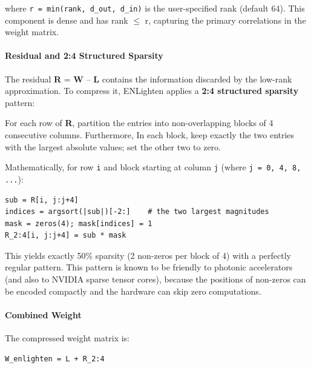 where \texttt{r = min(rank, d\_out, d\_in)} is the user-specified rank (default 64). This component is dense and has rank $\le$ r, capturing the primary correlations in the weight matrix.

\paragraph{Residual and 2:4 Structured Sparsity}

The residual \textbf{R} = \textbf{W} -- \textbf{L} contains the information discarded by the low-rank approximation. To compress it, ENLighten applies a \textbf{2:4 structured sparsity} pattern:

For each row of \textbf{R}, partition the entries into non-overlapping blocks of 4 consecutive columns. Furthermore, In each block, keep exactly the two entries with the largest absolute values; set the other two to zero.


Mathematically, for row \texttt{i} and block starting at column \texttt{j} (where \texttt{j = 0, 4, 8, ...}):

\vspace{0.5em}
\begin{mdframed}[backgroundcolor=codebg, linecolor=codeframe, linewidth=1pt, roundcorner=4pt, innerleftmargin=2pt, innerrightmargin=5pt, innertopmargin=5pt, innerbottommargin=5pt]
\begin{lstlisting}
sub = R[i, j:j+4]
indices = argsort(|sub|)[-2:]    # the two largest magnitudes
mask = zeros(4); mask[indices] = 1
R_2:4[i, j:j+4] = sub * mask
\end{lstlisting}
\end{mdframed}
\vspace{0.5em}

This yields exactly 50\% sparsity (2 non-zeros per block of 4) with a perfectly regular pattern. This pattern is known to be friendly to photonic accelerators (and also to NVIDIA sparse tensor cores), because the positions of non-zeros can be encoded compactly and the hardware can skip zero computations.

\paragraph{Combined Weight}

The compressed weight matrix is:

\vspace{0.5em}
\begin{mdframed}[backgroundcolor=codebg, linecolor=codeframe, linewidth=1pt, roundcorner=4pt, innerleftmargin=2pt, innerrightmargin=5pt, innertopmargin=5pt, innerbottommargin=5pt]
\begin{lstlisting}
W_enlighten = L + R_2:4
\end{lstlisting}
\end{mdframed}
\vspace{0.5em}

